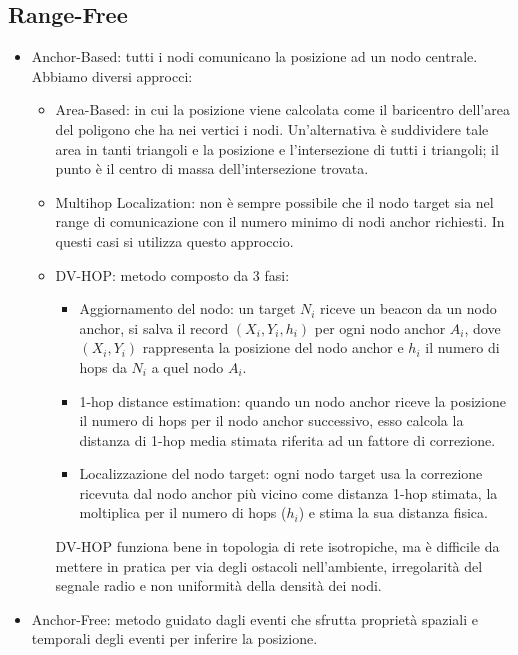         \newpage

        \subsection{Range-Free}\label{subsubsec3.4.2}
        \begin{itemize}
                \item Anchor-Based: tutti i nodi comunicano la posizione ad un
nodo centrale. Abbiamo diversi approcci:
                \begin{itemize}
                        \item Area-Based: in cui la posizione viene calcolata
come il baricentro dell'area del poligono che ha nei vertici i nodi.
Un'alternativa è suddividere tale area in tanti triangoli e la posizione e
l'intersezione di tutti i triangoli; il punto è il centro di massa
dell'intersezione trovata.
                        \item Multihop Localization: non è sempre possibile che
il nodo target sia nel range di comunicazione con il numero minimo di nodi
anchor richiesti. In questi casi si utilizza questo approccio.
                        \item DV-HOP: metodo composto da 3 fasi:
                        \begin{itemize}
                                \item Aggiornamento del nodo: un target $N_i$
riceve un beacon da un nodo anchor, si salva il record $(X_i, Y_i, h_i)$ per
ogni nodo anchor $A_i$, dove $(X_i, Y_i)$ rappresenta la posizione del nodo
anchor e $h_i$ il numero di hops da $N_i$ a quel nodo $A_i$.
                                \item 1-hop distance estimation: quando un nodo
anchor riceve la posizione il numero di hops per il nodo anchor successivo, esso
calcola la distanza di 1-hop media stimata riferita ad un fattore di correzione.
                                \item Localizzazione del nodo target: ogni nodo
target usa la correzione ricevuta dal nodo anchor più vicino come distanza 1-hop
stimata, la moltiplica per il numero di hops ($h_i$) e stima la sua distanza
fisica.
                        \end{itemize}
                        DV-HOP funziona bene in topologia di rete isotropiche,
ma è difficile da mettere in pratica per via degli ostacoli nell'ambiente,
irregolarità del segnale radio e non uniformità della densità dei nodi.
                \end{itemize}
                \item Anchor-Free: metodo guidato dagli eventi che sfrutta
proprietà spaziali e temporali degli eventi per inferire la posizione.
        \end{itemize}

